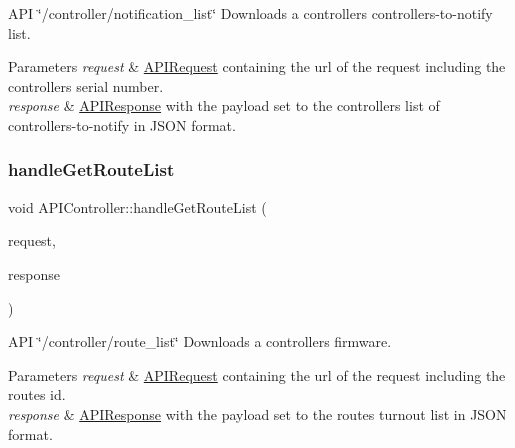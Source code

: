A\+PI \char`\"{}/controller/notification\+\_\+list\char`\"{} Downloads a controller\textquotesingle{}s controllers-\/to-\/notify list. 
\begin{DoxyParams}{Parameters}
{\em request} & \hyperlink{class_a_p_i_request}{A\+P\+I\+Request} containing the url of the request including the controller\textquotesingle{}s serial number. \\
\hline
{\em response} & \hyperlink{class_a_p_i_response}{A\+P\+I\+Response} with the payload set to the controller\textquotesingle{}s list of controllers-\/to-\/notify in J\+S\+ON format. \\
\hline
\end{DoxyParams}
\mbox{\label{class_a_p_i_controller_aabd8df21b8058798432d8cc117e23315}} 
\subsubsection{\texorpdfstring{handle\+Get\+Route\+List}{handleGetRouteList}}
{\footnotesize\ttfamily void A\+P\+I\+Controller\+::handle\+Get\+Route\+List (\begin{DoxyParamCaption}\item[{const \hyperlink{class_a_p_i_request}{A\+P\+I\+Request} \&}]{request,  }\item[{\hyperlink{class_a_p_i_response}{A\+P\+I\+Response} $\ast$}]{response }\end{DoxyParamCaption})\hspace{0.3cm}{\ttfamily [slot]}}

A\+PI \char`\"{}/controller/route\+\_\+list\char`\"{} Downloads a controller\textquotesingle{}s firmware. 
\begin{DoxyParams}{Parameters}
{\em request} & \hyperlink{class_a_p_i_request}{A\+P\+I\+Request} containing the url of the request including the route\textquotesingle{}s id. \\
\hline
{\em response} & \hyperlink{class_a_p_i_response}{A\+P\+I\+Response} with the payload set to the route\textquotesingle{}s turnout list in J\+S\+ON format. \\
\hline
\end{DoxyParams}
\mbox{\label{class_a_p_i_controller_a6274380cb71807d07d813b7e67e0c0c2}} 
